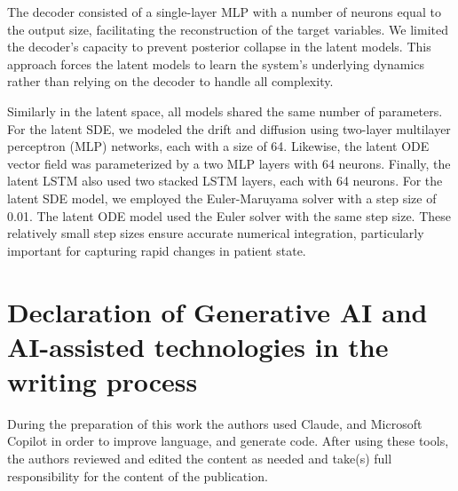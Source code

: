 \documentclass[preprint,12pt]{elsarticle}
\begin{document}
The decoder consisted of a single-layer MLP with a number of neurons equal to the output size, facilitating the reconstruction of the target variables. We limited the decoder's capacity to prevent posterior collapse in the latent models. This approach forces the latent models to learn the system's underlying dynamics rather than relying on the decoder to handle all complexity.

Similarly in the latent space, all models shared the same number of parameters. For the latent SDE, we modeled the drift and diffusion using two-layer multilayer perceptron (MLP) networks, each with a size of 64. Likewise, the latent ODE vector field was parameterized by a two MLP layers with 64 neurons. Finally, the latent LSTM also used two stacked LSTM layers, each with 64 neurons. For the latent SDE model, we employed the Euler-Maruyama solver with a step size of 0.01. The latent ODE model used the Euler solver with the same step size. These relatively small step sizes ensure accurate numerical integration, particularly important for capturing rapid changes in patient state.



\section*{Declaration of Generative AI and AI-assisted technologies in the writing process}
During the preparation of this work the authors used Claude, and Microsoft Copilot in order to improve language, and generate code. After using these tools, the authors reviewed and edited the content as needed and take(s) full responsibility for the content of the publication.
 

\end{document}
